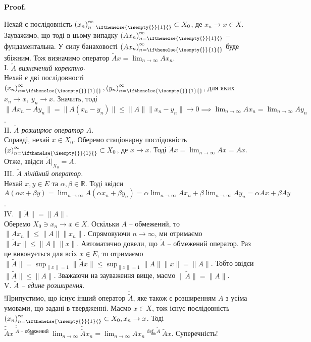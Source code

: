 \documentclass[a4paper, 10pt]{article}
\makeatletter
\theoremstyle{theoremdd}
\theoremstyle{theoremdd}
\theoremstyle{theoremdd}
\theoremstyle{theoremdd}
\theoremstyle{theoremdd}
\theoremstyle{theoremdd}
\theoremstyle{theoremdd}
\theoremstyle{theoremdd}
\newcommand{\sequence}[2][]{\left({#2}\right)_{n=\ifthenelse{\isempty{#1}}{1}{#1}}^{\infty}}
\renewenvironment{proof}[1][Proof.\\]{\par
\pushQED{\hfill \qed}%
\normalfont \topsep6\p@\@plus6\p@\relax
\trivlist
\item\relax
{\bfseries
#1\@addpunct{.}}\hspace\labelsep\ignorespaces
}{%
\popQED\endtrivlist\@endpefalse
}
\makeatother
\begin{document}
\begin{proof}
Нехай є послідовність $\sequence{x_n} \subset X_0$, де $x_n \to x \in X$. Зауважимо, що тоді в цьому випадку $\sequence{Ax_n}$ -- фундаментальна. У силу банаховості $\sequence{Ax_n}$ буде збіжним. Тож визначимо оператор $\tilde{A}x = \displaystyle\lim_{n \to \infty} Ax_n$.\\
I. \textit{$\tilde{A}$ визначений коректно}.\\
Нехай є дві послідовності $\sequence{x_n},\sequence{y_n}$, для яких $x_n \to x,\ y_n \to x$. Значить, тоді\\
$\|Ax_n - Ay_n\| = \|A(x_n-y_n)\| \leq \|A\| \|x_n-y_n\| \to 0 \implies \displaystyle\lim_{n \to \infty} Ax_n = \lim_{n \to \infty} Ay_n$.
\bigskip \\
II. \textit{$\tilde{A}$ розширює оператор $A$}.\\
Справді, нехай $x \in X_0$. Оберемо стаціонарну послідовність $\sequence{x} \subset X_0$, де $x \to x$. Тоді $\tilde{A}x = \displaystyle\lim_{n \to \infty} Ax = Ax$. Отже, звідси $\tilde{A}|_{X_0} = A$.
\bigskip \\
III. \textit{$\tilde{A}$ лінійний оператор}.\\
Нехай $x,y \in E$ та $\alpha,\beta \in \mathbb{R}$. Тоді звідси\\
$A(\alpha x + \beta y) = \displaystyle\lim_{n \to \infty} A(\alpha x_n + \beta y_n) = \alpha \lim_{n \to \infty} Ax_n + \beta \lim_{n \to \infty} Ay_n = \alpha Ax + \beta Ay$.
\bigskip \\
\iffalse
IV. \textit{$\tilde{A}$ -- обмежений оператор}.\\
Оберемо послідовність $\sequence{x_n} \subset X$ так, що $x_n \to 0$. Тоді\\
$\|\tilde{A}x_n\| = \displaystyle \| \lim_{m \to \infty} A x_n^{(m)} \| = \lim_{m \to \infty} \|A x_n^{(m)}\| \leq \lim_{m \to \infty} \|A\| \|x_n^{(m)}\| = \|A\| \| \lim_{m \to \infty} x_n^{(m)} \| = \|A\| \|x_n\| \to 0$ при $n \to \infty \implies \tilde{A}x_n \to A0$.
\bigskip \\
\fi
IV. $\|\tilde{A}\| = \|A\|$.\\
Оберемо $X_0 \ni x_n \to x \in X$. Оскільки $A$ -- обмежений, то $\|Ax_n\| \leq \|A\| \|x_n\|$. Спрямовуючи $n \to \infty$, ми отримаємо $\|\tilde{A}x\| \le \|A\| \|x\|$. Автоматично довели, що $\tilde{A}$ -- обмежений оператор. Раз це виконується для всіх $x \in E$, то отримаємо $\|\tilde{A}\|= \displaystyle\sup_{\|x\| = 1} \|\tilde{A}x\| \leq \sup_{\|x\| = 1} \|A\| \|x\| = \|A\|$. Тобто звідси $\|\tilde{A}\| \leq \|A\|$. Зважаючи на зауваження вище, маємо $\|\tilde{A}\| = \|A\|$.
\bigskip \\
V. \textit{$\tilde{A}$ -- єдине розширення}.\\
!Припустимо, що існує інший оператор $\tilde{\tilde{A}}$, яке також є розширенням $A$ з усіма умовами, що задані в твердженні. Маємо $x \in X$, тож існує послідовність $\sequence{x_n} \subset X_0, x_n \to x$. Тоді\\
$\tilde{\tilde{A}}x \overset{\tilde{\tilde{A}} \text{ -- обмежений}}{=} \displaystyle\lim_{n \to \infty} \tilde{\tilde{A}}x_n = \lim_{n \to \infty} Ax_n \overset{\text{def. } \tilde{A}}{=} \tilde{A}x$. Суперечність!
\end{proof}
\end{document}
